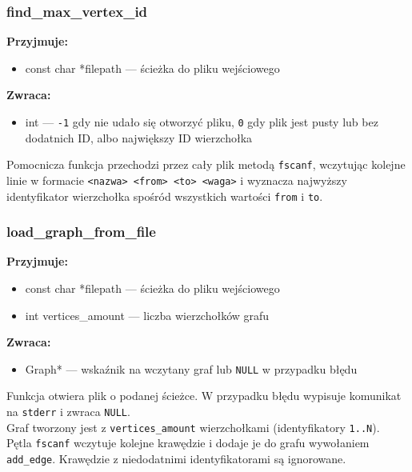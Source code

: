 \documentclass[12pt]{article}
\begin{document}
\subsubsection{find\_max\_vertex\_id}
\textbf{Przyjmuje:}
\begin{itemize}
	\item const char *filepath --- ścieżka do pliku wejściowego
\end{itemize}
\textbf{Zwraca:}
\begin{itemize}
	\item int --- \texttt{-1} gdy nie udało się otworzyć pliku, \texttt{0} gdy plik jest pusty lub bez dodatnich ID, albo największy ID wierzchołka
\end{itemize}
Pomocnicza funkcja przechodzi przez cały plik metodą \texttt{fscanf}, wczytując kolejne
linie w formacie \texttt{<nazwa> <from> <to> <waga>} i wyznacza najwyższy identyfikator
wierzchołka spośród wszystkich wartości \texttt{from} i \texttt{to}.

\subsubsection{load\_graph\_from\_file}
\textbf{Przyjmuje:}
\begin{itemize}
	\item const char *filepath --- ścieżka do pliku wejściowego
	\item int vertices\_amount --- liczba wierzchołków grafu
\end{itemize}
\textbf{Zwraca:}
\begin{itemize}
	\item Graph* --- wskaźnik na wczytany graf lub \texttt{NULL} w przypadku błędu
\end{itemize}
Funkcja otwiera plik o podanej ścieżce. W przypadku błędu wypisuje komunikat na
\texttt{stderr} i zwraca \texttt{NULL}.\\
Graf tworzony jest z \texttt{vertices\_amount} wierzchołkami (identyfikatory \texttt{1..N}).\\
Pętla \texttt{fscanf} wczytuje kolejne krawędzie i dodaje je do grafu wywołaniem
\texttt{add\_edge}. Krawędzie z niedodatnimi identyfikatorami są ignorowane.
\end{document}
